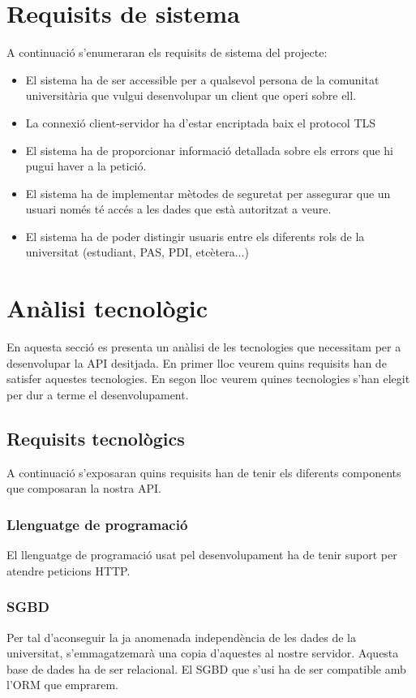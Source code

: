 \section{Requisits de sistema}
A continuació s'enumeraran els requisits de sistema del projecte:
\begin{itemize}
	\item El sistema ha de ser accessible per a qualsevol persona de la comunitat universitària que vulgui desenvolupar un client que operi sobre ell.
	\item La connexió client-servidor ha d'estar encriptada baix el protocol \ac{TLS}
	\item El sistema ha de proporcionar informació detallada sobre els errors que hi pugui haver a la petició.
	\item El sistema ha de implementar mètodes de seguretat per assegurar que un usuari només té accés a les dades que està autoritzat a veure.
	\item El sistema ha de poder distingir usuaris entre els diferents rols de la universitat (estudiant, \ac{PAS}, \ac{PDI}, etcètera...)
\end{itemize}

\section{Anàlisi tecnològic}
En aquesta secció es presenta un anàlisi de les tecnologies que necessitam per a desenvolupar la \ac{API} desitjada. En primer lloc veurem quins requisits han de satisfer aquestes tecnologies. En segon lloc veurem quines tecnologies s'han elegit per dur a terme el desenvolupament.

\subsection{Requisits tecnològics}
A continuació s'exposaran quins requisits han de tenir els diferents components que composaran la nostra \ac{API}. 
	
	\subsubsection{Llenguatge de programació}
	El llenguatge de programació usat pel desenvolupament ha de tenir suport per atendre peticions \ac{HTTP}. 
	
	\subsubsection{\ac{SGBD}}
	Per tal d'aconseguir la ja anomenada independència de les dades de la universitat, s'emmagatzemarà una copia d'aquestes al nostre servidor. Aquesta base de dades ha de ser relacional. El \ac{SGBD} que s'usi ha de ser compatible amb l'\ac{ORM} que emprarem.

